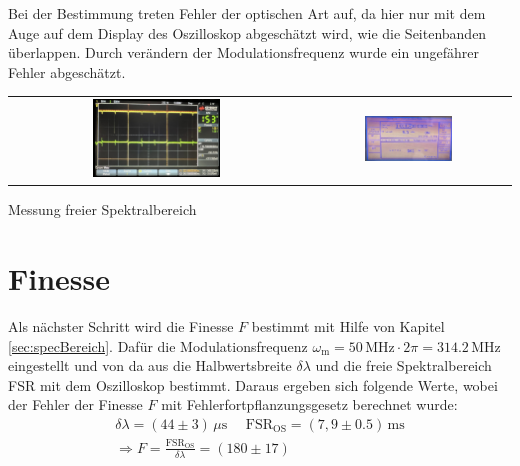 Bei der Bestimmung treten Fehler der optischen Art auf, da hier nur mit dem Auge auf dem Display des Oszilloskop abgeschätzt wird, wie die Seitenbanden überlappen. Durch verändern der Modulationsfrequenz wurde ein ungefährer Fehler abgeschätzt.

\begin{center}
    \captionsetup{type=figure}
    \begin{tabular}{c c}
        \includegraphics[width=0.45\textwidth]{Bilder/FSR/fsr_oszi.jpg} & \includegraphics[width=0.45\textwidth]{Bilder/FSR/fsr_hf-generator.jpg}
    \end{tabular}
    \caption{Messung freier Spektralbereich}
    \label{fig:specBereich}
\end{center}

\newpage
\section{Finesse}
\label{sec:finess}

Als nächster Schritt wird die Finesse $F$ bestimmt mit Hilfe von Kapitel \ref{sec:specBereich}. Dafür die Modulationsfrequenz $\omega_\mathrm{m} = 50\,\mathrm{MHz} \cdot 2\pi = 314.2\,\mathrm{MHz}$ eingestellt und von da aus die Halbwertsbreite $\delta \lambda$ und die freie Spektralbereich FSR mit dem Oszilloskop bestimmt. Daraus ergeben sich folgende Werte, wobei der Fehler der Finesse $F$ mit Fehlerfortpflanzungsgesetz berechnet wurde:
\begin{gather}
    \delta \lambda = ( 44 \pm 3)\,\mu\mathrm{s}~~~~~~\mathrm{FSR}_\mathrm{OS} = (7,9 \pm 0.5)\,\mathrm{ms}\\[0,5cm]
    \Rightarrow \boxed{F = \frac{\mathrm{FSR}_\mathrm{OS}}{\delta \lambda} = (180 \pm 17)}
\end{gather}

